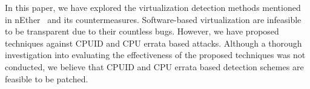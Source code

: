 In this paper, we have explored the virtualization detection methods mentioned
in nEther~\cite{nether} and its countermeasures. Software-based virtualization
are infeasible to be transparent due to their countless bugs. However, we have
proposed techniques against CPUID and CPU errata based attacks. Although a thorough investigation
into evaluating the effectiveness of the proposed techniques was not conducted,
we believe that CPUID and CPU errata based detection schemes are feasible to be patched.


